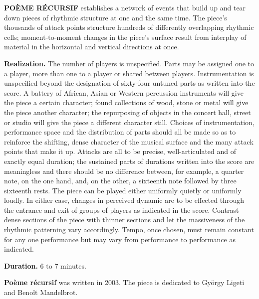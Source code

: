 \documentclass[11pt]{report}
\begin{document}
\textbf{POÈME RÉCURSIF} establishes a network of events that build up and tear
down pieces of rhythmic structure at one and the same time. The piece's
thousands of attack points structure hundreds of differently overlapping
rhythmic cells; moment-to-moment changes in the piece's surface result from
interplay of material in the horizontal and vertical directions at once.

\textbf{Realization.} The number of players is unspecified. Parts may be
assigned one to a player, more than one to a player or shared between players.
Instrumentation is unspecified beyond the designation of sixty-four untuned
parts as written into the score. A battery of African, Asian or Western
percussion instruments will give the piece a certain character; found
collections of wood, stone or metal will give the piece another character; the
repurposing of objects in the concert hall, street or studio will give the
piece a different character still. Choices of instrumentation, performance
space and the distribution of parts should all be made so as to reinforce the
shifting, dense character of the musical surface and the many attack points
that make it up. Attacks are all to be precise, well-articulated and of exactly
equal duration; the sustained parts of durations written into the score are
meaningless and there should be no difference between, for example, a quarter
note, on the one hand, and, on the other, a sixteenth note followed by three
sixteenth rests. The piece can be played either uniformly quietly or uniformly
loudly. In either case, changes in perceived dynamic are to be effected through
the entrance and exit of groups of players as indicated in the score. Contrast
dense sections of the piece with thinner sections and let the massiveness of
the rhythmic patterning vary accordingly. Tempo, once chosen, must remain
constant for any one performance but may vary from performance to performance
as indicated.

\textbf{Duration.} 6 to 7 minutes.

\vfill

\textbf{Po\`{e}me r\'{e}cursif} was written in 2003. The piece is dedicated to
Gy\"{o}rgy Ligeti and Beno\^{i}t Mandelbrot.
\end{document}
